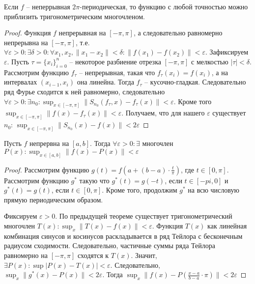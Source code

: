 \documentclass[document.tex]{subfiles}
\begin{document}
\begin{theorem}
    Если $f$ -- неперрывная $2\pi$-периодическая, то функцию с любой точностью можно приблизить тригонометрическим
    многочленом.
\end{theorem}

\begin{proof}
    Функция $f$ непрерывная на $[-\pi, \pi]$, а следовательно равномерно непрерывна на $[-\pi, \pi]$, т.е. $\forall
    \varepsilon > 0: \exists \delta > 0: \forall x_1, x_2, \|x_1 - x_2\| < \delta: \|f(x_1) - f(x_2)\| < \varepsilon$.
    Зафиксируем $\varepsilon$. Пусть
    $\tau = \{x_i\}_{i = 0}^n$ -- некоторое разбиение отрезка $[-\pi, \pi]$ с мелкостью $|\tau| < \delta$.
    Рассмотрим функцию $f_{\tau}$ -- непрерывная,
    такая что $f_{\tau}(x_i) = f(x_i)$, а на интервалах $(x_{i -1 }, x_i)$ она линейна. Тогда $f_{\tau}$ -- кусочно-гладкая.
    Следовательно ряд Фурье сходится к ней равномерно, следовательно $\forall \varepsilon > 0 : \exists n_0 :
    \sup_{x \in [-\pi, \pi]}\|S_{n_0}(f_{\tau}, x) - f_{\tau}(x)\| < \varepsilon$. Кроме того $\sup_{x \in [-\pi, \pi]}
    \|f(x) - f_{\tau}(x)\| < \varepsilon$. Получаем, что для нашего $\varepsilon$ существует $n_0$: $\sup_{x \in [-\pi,
    \pi]} \|S_{n_0}(x) - f(x)\| < 2\varepsilon$

\end{proof}

\begin{theorem}[Вейрштрасса]
    Пусть $f$ непрервна на $[a, b]$. Тогда $\forall \varepsilon > 0: \exists$ многочлен $P(x): \sup_{x \in [a, b]}
    \|f(x) - P(x)\| < \varepsilon$
\end{theorem}

\begin{proof}
    Рассмотрим функцию $g(t) = f(a + (b - a) \cdot \frac{t}{\pi})$, где $t \in [0, \pi]$. Рассмотрим функцию $g^*$ такую
    что $g^*(t) = g(-t)$, если $t \in [-pi, 0]$ и $g^*(t) = g(t)$, если $t \in [0, \pi]$. Кроме того, продолжим $g^*$ на
    всю числовую прямую периодическим образом.

    Фиксируем $\varepsilon > 0$. По предыдущей теореме существует тригонометрический многочлен $T(x):
    \sup_x \|T(x) - f(x)\| < \varepsilon$. Функция $T(x)$ как линейная комбинация синусов и косинусов раскладывается в
    ряд Тейлора с бесконечным радиусом сходимости. Следовательно, частичные суммы ряда Тейлора равномерно на $[-\pi,
    \pi]$ сходятся к $T(x)$. Значит, $\exists P(x): \sup |P(x) - T(x)| < \varepsilon$.
    Следовательно, $\sup_x \|g^*(x) - P(x)\| < 2 \varepsilon$. Тогда $\sup_x \|f(x) - P(\frac{x - a}{b - a} \cdot
    \pi)\| < 2 \varepsilon$

\end{proof}
\end{document}
